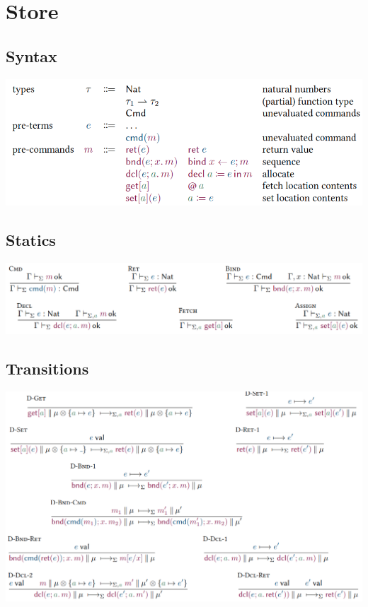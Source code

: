 \documentclass[11pt,a4paper,titlepage,dvipsnames,cmyk]{scrartcl}
\begin{document}
\newpage
\section{Store}
\subsection{Syntax}
\begin{center}
\includegraphics[width=\textwidth/3*2]{pics/syntax-store.png}
\end{center}
\subsection{Statics}
\includegraphics[width=\textwidth]{pics/static-store.png}
\subsection{Transitions}
\includegraphics[width=\textwidth]{pics/dynamic-store.png}
\end{document}

